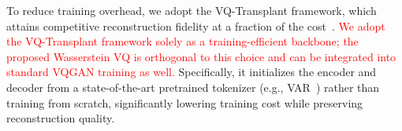 To reduce training overhead, we adopt the VQ-Transplant framework, which attains competitive reconstruction fidelity at a fraction of the cost~\citep{Fang2025VQTransplant}. 
\textcolor{red}{We adopt the VQ-Transplant framework solely as a training-efficient backbone; the proposed Wasserstein VQ is orthogonal to this choice and can be integrated into standard VQGAN training as well.}
Specifically, it initializes the encoder and decoder from a state-of-the-art pretrained tokenizer (e.g., VAR~\citep{Tian2024VisualAM}) rather than training from scratch, significantly lowering training cost while preserving reconstruction quality.




